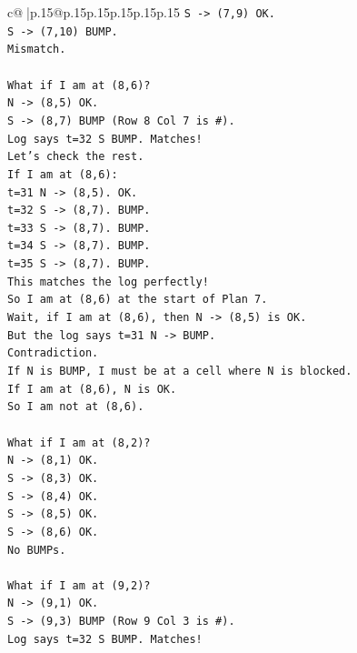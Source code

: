 \documentclass{article}
\begin{document}
{\begin{supertabular}{c@{$\;$}|p{.15\linewidth}@{}p{.15\linewidth}p{.15\linewidth}p{.15\linewidth}p{.15\linewidth}p{.15\linewidth}}
{{{\texttt{S {-}> (7,9) OK.} \\
\texttt{S {-}> (7,10) BUMP.} \\
\texttt{Mismatch.} \\
\\ 
\texttt{What if I am at (8,6)?} \\
\texttt{N {-}> (8,5) OK.} \\
\texttt{S {-}> (8,7) BUMP (Row 8 Col 7 is \#).} \\
\texttt{Log says t=32 S BUMP. Matches!} \\
\texttt{Let's check the rest.} \\
\texttt{If I am at (8,6):} \\
\texttt{t=31 N {-}> (8,5). OK.} \\
\texttt{t=32 S {-}> (8,7). BUMP.} \\
\texttt{t=33 S {-}> (8,7). BUMP.} \\
\texttt{t=34 S {-}> (8,7). BUMP.} \\
\texttt{t=35 S {-}> (8,7). BUMP.} \\
\texttt{This matches the log perfectly!} \\
\texttt{So I am at (8,6) at the start of Plan 7.} \\
\texttt{Wait, if I am at (8,6), then N {-}> (8,5) is OK.} \\
\texttt{But the log says t=31 N {-}> BUMP.} \\
\texttt{Contradiction.} \\
\texttt{If N is BUMP, I must be at a cell where N is blocked.} \\
\texttt{If I am at (8,6), N is OK.} \\
\texttt{So I am not at (8,6).} \\
\\ 
\texttt{What if I am at (8,2)?} \\
\texttt{N {-}> (8,1) OK.} \\
\texttt{S {-}> (8,3) OK.} \\
\texttt{S {-}> (8,4) OK.} \\
\texttt{S {-}> (8,5) OK.} \\
\texttt{S {-}> (8,6) OK.} \\
\texttt{No BUMPs.} \\
\\ 
\texttt{What if I am at (9,2)?} \\
\texttt{N {-}> (9,1) OK.} \\
\texttt{S {-}> (9,3) BUMP (Row 9 Col 3 is \#).} \\
\texttt{Log says t=32 S BUMP. Matches!} \\
}}}
\end{supertabular}}
\end{document}
